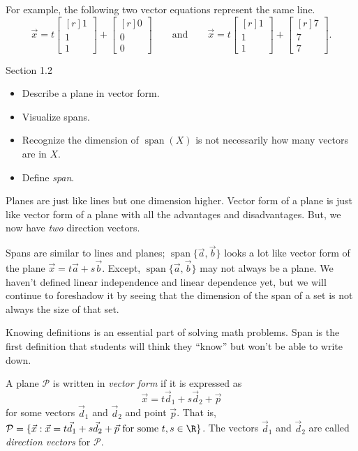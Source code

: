 \documentclass{problemset}
\DeclareMathOperator{\Span}{span}
\newcommand{\mat}[1]{\begin{bmatrix*}[r]#1\end{bmatrix*}}
\begin{document}
\begin{parts}
\begin{solution}
				For example, the following two vector equations represent the
				same line.
				\[
					\vec x = t \mat{1\\1\\1} + \mat{0\\0\\0}
					\qquad \text{and} \qquad
					\vec x = t \mat{1\\1\\1} + \mat{7\\7\\7}.
				\]
			\end{solution}
	\end{parts}


\begin{lesson}

	Section 1.2

	\begin{itemize}
		\item Describe a plane in vector form.
		\item Visualize spans.
		\item Recognize the dimension of $\Span(X)$ is not necessarily how many vectors
			are in $X$.
		\item Define \emph{span}.
	\end{itemize}

	Planes are just like lines but one dimension higher. Vector form of a plane is just like
	vector form of a plane with all the advantages and disadvantages. But, we now have
	\emph{two} direction vectors.

	Spans are similar to lines and planes; $\Span\{\vec a,\vec b\}$ looks a lot like
	vector form of the plane
	$\vec x=t\vec a+s\vec b$. Except, $\Span\{\vec a,\vec b\}$ may not always be a plane.
	We haven't defined linear independence and linear dependence yet, but we will continue to
	foreshadow it by seeing that the dimension of the span of a set is not always the size of
	that set.

	Knowing definitions is an essential part of solving math problems. Span is
	the first definition that students will think they ``know'' but won't be
	able to write down.

\end{lesson}

	\begin{definition}
		A plane $\mathcal P$ is written in \emph{vector form} if it is expressed
		as
		\[
			\vec x=t\vec d_1 +s\vec d_2+\vec p
		\]
		for some vectors $\vec d_1$ and $\vec d_2$ and
		point $\vec p$. That is, $\mathcal P = \{\vec x: \vec x=
		t\vec d_1+s\vec d_2 +\vec p\text{ for some } t,s\in\R \}$. The vectors
		$\vec d_1$ and $\vec d_2$ are called \emph{direction
		vectors} for $\mathcal P$.
	\end{definition}
\end{document}
